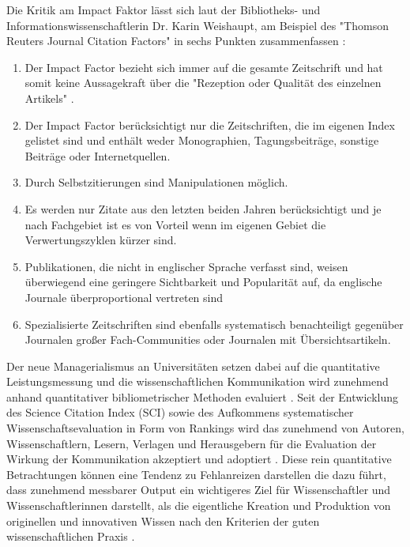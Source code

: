 Die Kritik am Impact Faktor lässt sich laut der Bibliotheks- und Informationswissenschaftlerin Dr. Karin Weishaupt, am Beispiel des "Thomson Reuters Journal Citation Factors" in sechs Punkten zusammenfassen \cite{weishaupt_2009_goldenOA}:
\begin{enumerate}
\item Der Impact Factor bezieht sich immer auf die gesamte Zeitschrift und hat somit keine Aussagekraft über die "Rezeption oder Qualität des einzelnen Artikels" \cite{weishaupt_2009_goldenOA}.
\item Der Impact Factor berücksichtigt nur die Zeitschriften, die im eigenen Index gelistet sind und enthält weder Monographien, Tagungsbeiträge, sonstige Beiträge oder Internetquellen.
\item Durch Selbstzitierungen sind Manipulationen möglich.
\item Es werden nur Zitate aus den letzten beiden Jahren berücksichtigt und je nach Fachgebiet ist es von Vorteil wenn im eigenen Gebiet die Verwertungszyklen kürzer sind.
\item Publikationen, die nicht in englischer Sprache verfasst sind, weisen überwiegend eine geringere Sichtbarkeit und Popularität auf, da englische Journale überproportional vertreten sind
\item Spezialisierte Zeitschriften sind ebenfalls systematisch benachteiligt gegenüber Journalen großer Fach-Communities oder Journalen mit Übersichtsartikeln.
\end{enumerate}

Der neue Managerialismus an Universitäten setzen dabei auf die quantitative Leistungsmessung und die wissenschaftlichen Kommunikation wird zunehmend anhand quantitativer bibliometrischer Methoden evaluiert \cite[:40]{Frost_2014}. Seit der Entwicklung des Science Citation Index (SCI) sowie des Aufkommens systematischer Wissenschaftsevaluation in Form von Rankings wird das zunehmend von Autoren, Wissenschaftlern, Lesern, Verlagen und Herausgebern für die Evaluation der Wirkung der Kommunikation akzeptiert und adoptiert \cite[:2]{haustein_2012_multidimensional}. Diese rein quantitative Betrachtungen können eine Tendenz zu Fehlanreizen darstellen \cite{wr_2015_wissenschaft_integritaet} die dazu führt, dass zunehmend messbarer Output ein wichtigeres Ziel für Wissenschaftler und Wissenschaftlerinnen darstellt, als die eigentliche Kreation und Produktion von originellen und innovativen Wissen nach den Kriterien der guten wissenschaftlichen Praxis \cite[:41]{Frost_2014}.

